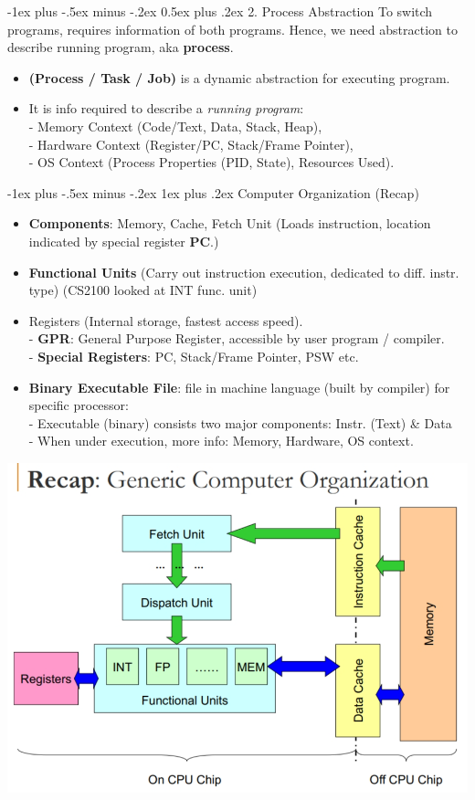 \documentclass[10pt, landscape]{article}
\makeatletter
\renewcommand{\section}{\@startsection{section}{1}{0mm}%
                                {-1ex plus -.5ex minus -.2ex}%
                                {0.5ex plus .2ex}%
                                {\normalfont\large\bfseries}}
\renewcommand{\subsubsection}{\@startsection{subsubsection}{3}{0mm}%
                                {-1ex plus -.5ex minus -.2ex}%
                                {1ex plus .2ex}%
                                {\normalfont\small\bfseries}}
\makeatother
\begin{document}
\begin{multicols*}{3}
\null \null \null \null
\null \null \null \null

\columnbreak


\section{2. Process Abstraction}
To switch programs, requires information of both programs. Hence, we need abstraction to describe running program, aka \textbf{process}.
\begin{itemize}
\item \textbf{(Process / Task / Job)} is a dynamic abstraction for executing program. 
\item It is info required to describe a \textit{running program}: \\
- Memory Context (Code/Text, Data, Stack, Heap),\\
- Hardware Context (Register/PC, Stack/Frame Pointer), \\
- OS Context (Process Properties (PID, State), Resources Used).
\end{itemize}

\subsubsection{Computer Organization (Recap)}
\begin{itemize}
\item \textbf{Components}: Memory, Cache, Fetch Unit (Loads instruction, location indicated by special register \textbf{PC}.)
\item \textbf{Functional Units} (Carry out instruction execution, dedicated to diff. instr. type) (CS2100 looked at INT func. unit)
\item Registers (Internal storage, fastest access speed). \\
- \textbf{GPR}: General Purpose Register, accessible by user program / compiler. \\
- \textbf{Special Registers}: PC, Stack/Frame Pointer, PSW etc.
\item \textbf{Binary Executable File}: file in machine language (built by compiler) for specific processor: \\
- Executable (binary) consists two major components: Instr. (Text) \& Data \\
- When under execution, more info: Memory, Hardware, OS context.	
\end{itemize}
\centerline{\includegraphics[width=0.6\linewidth]{computerOrg}}


\end{multicols*}
\end{document}
